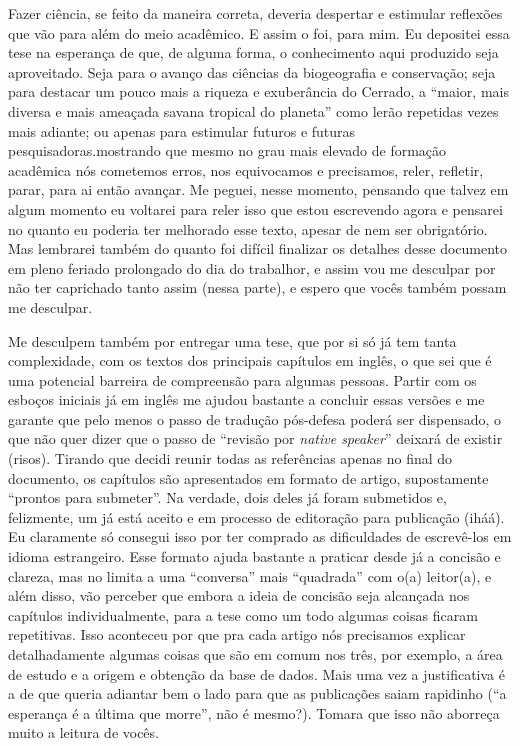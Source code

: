 \documentclass[12pt,openright,oneside,a4paper,english]{abntex2}
\begin{document}

Fazer ciência, se feito da maneira correta, deveria despertar e estimular reflexões que vão para além do meio acadêmico. E assim o foi, para mim. Eu depositei essa tese na esperança de que, de alguma forma, o conhecimento aqui produzido seja aproveitado. Seja para o avanço das ciências da biogeografia e conservação; seja para destacar um pouco mais a riqueza e exuberância do Cerrado, a “maior, mais diversa e mais ameaçada savana tropical do planeta” como lerão repetidas vezes mais adiante; ou apenas para estimular futuros e futuras pesquisadoras.mostrando que mesmo no grau mais elevado de formação acadêmica nós cometemos erros, nos equivocamos e precisamos, reler, refletir, parar, para ai então avançar. Me peguei, nesse momento, pensando que talvez em algum momento eu voltarei para reler isso que estou escrevendo agora e pensarei no quanto eu poderia ter melhorado esse texto, apesar de nem ser obrigatório. Mas lembrarei também do quanto foi difícil finalizar os detalhes desse documento em pleno feriado prolongado do dia do trabalhor, e assim vou me desculpar por não ter caprichado tanto assim (nessa parte), e espero que vocês também possam me desculpar. 

Me desculpem também por entregar uma tese, que por si só já tem tanta complexidade, com os textos dos principais capítulos em inglês, o que sei que é uma potencial barreira de compreensão para algumas pessoas. Partir com os esboços iniciais já em inglês me ajudou bastante a concluir essas versões e me garante que pelo menos o passo de tradução pós-defesa poderá ser dispensado, o que não quer dizer que o passo de “revisão por \textit{native speaker}” deixará de existir (risos). Tirando que decidi reunir todas as referências apenas no final do documento, os capítulos são apresentados em formato de artigo, supostamente “prontos para submeter”. Na verdade, dois deles já foram submetidos e, felizmente, um já está aceito e em processo de editoração para publicação (iháá). Eu claramente só consegui isso por ter comprado as dificuldades de escrevê-los em idioma estrangeiro. Esse formato ajuda bastante a praticar desde já a concisão e clareza, mas no limita a uma “conversa” mais “quadrada” com o(a) leitor(a), e além disso, vão perceber que embora a ideia de concisão seja alcançada nos capítulos individualmente, para a tese como um todo algumas coisas ficaram repetitivas. Isso aconteceu por que pra cada artigo nós precisamos explicar detalhadamente algumas coisas que são em comum nos três, por exemplo, a área de estudo e a origem e obtenção da base de dados. Mais uma vez a justificativa é a de que queria adiantar bem o lado para que as publicações saiam rapidinho (“a esperança é a última que morre”, não é mesmo?). Tomara que isso não aborreça muito a leitura de vocês.
\end{document}
